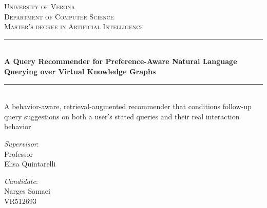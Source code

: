 \documentclass[a4paper,11pt]{report}
\begin{document}
\begin{titlepage}
\newcommand{\HRule}{\rule{\linewidth}{0.5mm}} %
\setlength{\topmargin}{0in}
\center


\textsc{\huge University of Verona}\\[0.2cm] %
\textsc{\large Department of Computer Science}\\[0.1cm] %
\textsc{\large Master's degree in Artificial Intelligence}\\[4cm]

\HRule \\[0.5cm]
{ \LARGE \bfseries A Query Recommender for Preference-Aware Natural Language Querying over Virtual Knowledge Graphs}

\HRule \\[1cm]

{\large A behavior-aware, retrieval-augmented recommender that conditions follow-up query
suggestions on both a user's stated queries and their real interaction behavior}

\vspace{2cm}


\begin{minipage}[t]{0.49\textwidth}
	{\large{\textit{Supervisor}:\\ Professor\\ Elisa Quintarelli}}


    \vspace{0.5cm}

\end{minipage}\hfill\begin{minipage}[t]{0.47\textwidth}\raggedleft
  {\large{\textit{Candidate}:\\ Narges Samaei\\ VR512693 \\ }}
  \vspace{40mm}
\end{minipage}
\end{titlepage}
\end{document}
